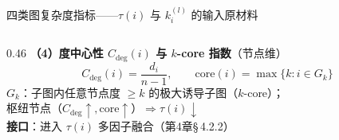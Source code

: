 \documentclass[aspectratio=169,9pt,xcolor=dvipsnames]{beamer}
\newcommand{\blue}[1]{\textcolor{mynavy}{#1}}
\begin{document}
\begin{frame}{四类图复杂度指标——$\tau(i)$ 与 $k_i^{(l)}$ 的输入原材料}
\begin{columns}[T]
\begin{column}{0.46\textwidth}
  \medskip
  \textbf{\blue{（4）度中心性 $C_{\mathrm{deg}}(i)$ 与 $k$-core 指数}}（节点维）
  \begin{equation*}
    C_{\mathrm{deg}}(i)=\frac{d_i}{n-1},\qquad
    \mathrm{core}(i)=\max\{k: i\in G_k\}
  \end{equation*}
  $G_k$：子图内任意节点度 $\geq k$ 的极大诱导子图（$k$-core）；\\
  枢纽节点（$C_{\mathrm{deg}}\uparrow,\mathrm{core}\uparrow$）$\Rightarrow\tau(i)\downarrow$\\
  \textbf{接口}：进入 $\tau(i)$ 多因子融合（第4章§\,4.2.2）

\end{column}
\end{columns}
\end{frame}
\end{document}
